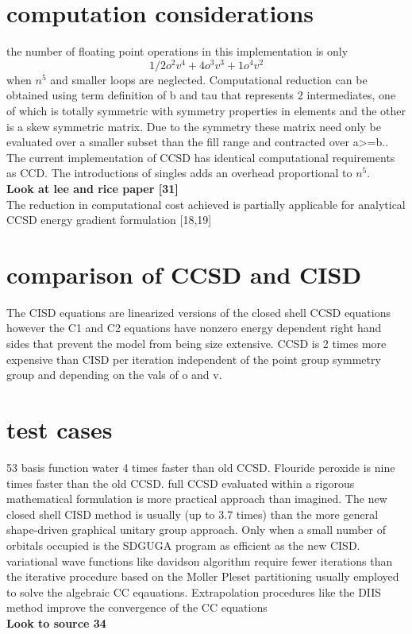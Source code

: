\documentclass[10pt, draft]{article}
\begin{document}
  \section{computation considerations}
  the number of floating point operations in this implementation is only 
  \[1/2 o^2v^4 + 4o^3v^3 + 1 o^4v^2\]
  when $n^5$ and smaller loops are neglected. Computational reduction can be obtained using term definition of b and tau that represents 2 intermediates, one of which is totally symmetric with symmetry properties in elements and the other is a skew symmetric matrix. Due to the symmetry these matrix need only be evaluated over a smaller subset than the fill range and contracted over a>=b.. The current implementation of CCSD has identical computational requirements as CCD.  The introductions of singles adds an overhead proportional to $n^5$. \\
  \textbf{Look at lee and rice paper [31]}\\
  The reduction in computational cost achieved is partially applicable for analytical CCSD energy gradient formulation [18,19]
  
  
  \section{comparison of CCSD and CISD}
  The CISD equations are linearized versions of the closed shell CCSD equations however the C1 and C2 equations have nonzero energy dependent right hand sides that prevent the model from being size extensive.  CCSD is 2 times more expensive than CISD per iteration independent of the point group symmetry group and depending on the vals of o and v.  
  
  
  \section{test cases}
  53 basis function water 4 times faster than old CCSD. Flouride peroxide is nine times faster than the old CCSD.  full CCSD evaluated within a rigorous mathematical formulation is more practical approach than imagined. The new closed shell CISD method is usually (up to 3.7 times) than the more general shape-driven graphical unitary group approach.  Only when a small number of orbitals occupied is the SDGUGA program as efficient as the new CISD.\\
  variational wave functions like davidson algorithm require fewer iterations than the iterative procedure based on the Moller Pleset partitioning usually employed to solve the algebraic CC eqauations.  Extrapolation procedures like the DIIS method improve the convergence of the CC equations\\
  \textbf{Look to source 34}\\
  
\end{document}
